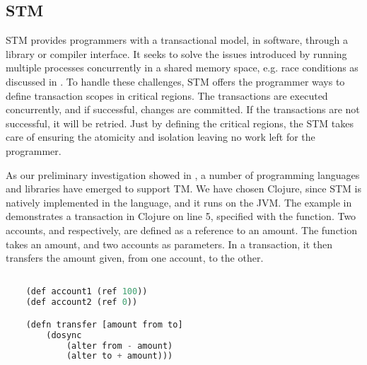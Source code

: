 \subsection{\acl{STM}}\label{sec:stm_stm}
\ac{STM} provides programmers with a transactional model, in software, through a library or compiler interface\cite{herlihy2011tm}. It seeks to solve the issues introduced by running multiple processes concurrently in a shared memory space, e.g. race conditions as discussed in . To handle these challenges, \ac{STM} offers the programmer ways to define transaction scopes in critical regions. The transactions are executed concurrently, and if successful, changes are committed. If the transactions are not successful, it will be retried. Just by defining the critical regions, the \ac{STM} takes care of ensuring the atomicity and isolation leaving no work left for the programmer. 

As our preliminary investigation showed in , a number of programming languages and libraries have emerged to support TM. We have chosen Clojure, since \ac{STM} is natively implemented in the language, and it runs on the \ac{JVM}. The example in  demonstrates a transaction in Clojure on line 5, specified with the  function. Two accounts,  and  respectively, are defined as a reference to an amount. The function  takes an amount, and two accounts as parameters. In a transaction, it then transfers the amount given, from one account, to the other.

\begin{lstlisting}[label=lst:stmexample,
  caption={STM in Clojure},
  language=Lisp,  
  showspaces=false,
  showtabs=false,
  breaklines=true,
  showstringspaces=false,
  breakatwhitespace=true,
  commentstyle=\color{greencomments},
  keywordstyle=\color{bluekeywords},
  stringstyle=\color{redstrings}]  % Start your code-block

	(def account1 (ref 100))
	(def account2 (ref 0))

	(defn transfer [amount from to]
    	(dosync
    		(alter from - amount)
    		(alter to + amount)))
       
\end{lstlisting}

